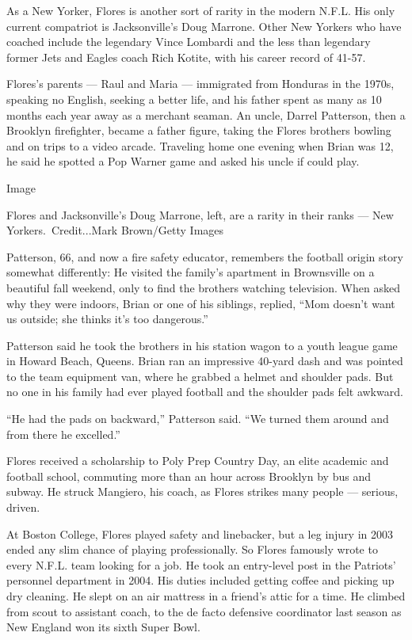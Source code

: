 As a New Yorker, Flores is another sort of rarity in the modern N.F.L.
His only current compatriot is Jacksonville's Doug Marrone. Other New
Yorkers who have coached include the legendary Vince Lombardi and the
less than legendary former Jets and Eagles coach Rich Kotite, with his
career record of 41-57.

Flores's parents --- Raul and Maria --- immigrated from Honduras in the
1970s, speaking no English, seeking a better life, and his father spent
as many as 10 months each year away as a merchant seaman. An uncle,
Darrel Patterson, then a Brooklyn firefighter, became a father figure,
taking the Flores brothers bowling and on trips to a video arcade.
Traveling home one evening when Brian was 12, he said he spotted a Pop
Warner game and asked his uncle if could play.

Image

Flores and Jacksonville's Doug Marrone, left, are a rarity in their
ranks --- New Yorkers.~Credit...Mark Brown/Getty Images

Patterson, 66, and now a fire safety educator, remembers the football
origin story somewhat differently: He visited the family's apartment in
Brownsville on a beautiful fall weekend, only to find the brothers
watching television. When asked why they were indoors, Brian or one of
his siblings, replied, ``Mom doesn't want us outside; she thinks it's
too dangerous.''

Patterson said he took the brothers in his station wagon to a youth
league game in Howard Beach, Queens. Brian ran an impressive 40-yard
dash and was pointed to the team equipment van, where he grabbed a
helmet and shoulder pads. But no one in his family had ever played
football and the shoulder pads felt awkward.

``He had the pads on backward,'' Patterson said. ``We turned them around
and from there he excelled.''

Flores received a scholarship to Poly Prep Country Day, an elite
academic and football school, commuting more than an hour across
Brooklyn by bus and subway. He struck Mangiero, his coach, as Flores
strikes many people --- serious, driven.

At Boston College, Flores played safety and linebacker, but a leg injury
in 2003 ended any slim chance of playing professionally. So Flores
famously wrote to every N.F.L. team looking for a job. He took an
entry-level post in the Patriots' personnel department in 2004. His
duties included getting coffee and picking up dry cleaning. He slept on
an air mattress in a friend's attic for a time. He climbed from scout to
assistant coach, to the de facto defensive coordinator last season as
New England won its sixth Super Bowl.

